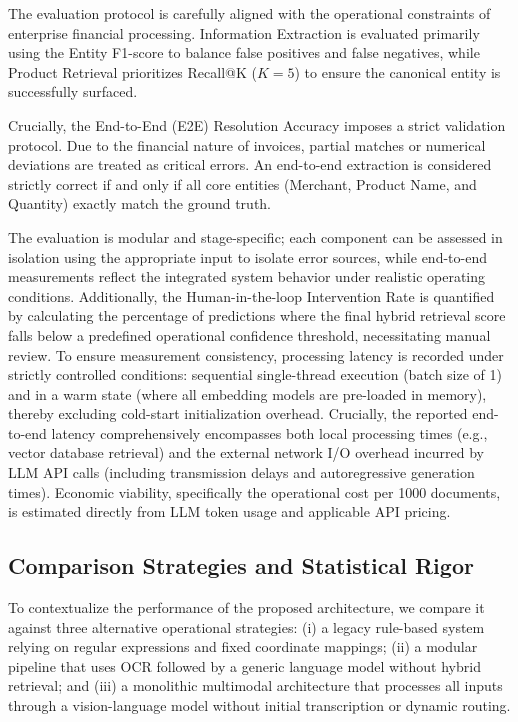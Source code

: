 The evaluation protocol is carefully aligned with the operational constraints of enterprise financial processing. Information Extraction is evaluated primarily using the Entity F1-score to balance false positives and false negatives, while Product Retrieval prioritizes Recall@K ($K=5$) to ensure the canonical entity is successfully surfaced. 

Crucially, the End-to-End (E2E) Resolution Accuracy imposes a strict validation protocol. Due to the financial nature of invoices, partial matches or numerical deviations are treated as critical errors. An end-to-end extraction is considered strictly correct if and only if all core entities (Merchant, Product Name, and Quantity) exactly match the ground truth.

The evaluation is modular and stage-specific; each component can be assessed in isolation using the appropriate input to isolate error sources, while end-to-end measurements reflect the integrated system behavior under realistic operating conditions. Additionally, the Human-in-the-loop Intervention Rate is quantified by calculating the percentage of predictions where the final hybrid retrieval score falls below a predefined operational confidence threshold, necessitating manual review. To ensure measurement consistency, processing latency is recorded under strictly controlled conditions: sequential single-thread execution (batch size of 1) and in a warm state (where all embedding models are pre-loaded in memory), thereby excluding cold-start initialization overhead. Crucially, the reported end-to-end latency comprehensively encompasses both local processing times (e.g., vector database retrieval) and the external network I/O overhead incurred by LLM API calls (including transmission delays and autoregressive generation times). Economic viability, specifically the operational cost per 1000 documents, is estimated directly from LLM token usage and applicable API pricing.

\subsection{Comparison Strategies and Statistical Rigor}
To contextualize the performance of the proposed architecture, we compare it against three alternative operational strategies:
(i) a legacy rule-based system relying on regular expressions and fixed coordinate mappings;
(ii) a modular pipeline that uses OCR followed by a generic language model without hybrid retrieval; and
(iii) a monolithic multimodal architecture that processes all inputs through a vision-language model without initial transcription or dynamic routing.

